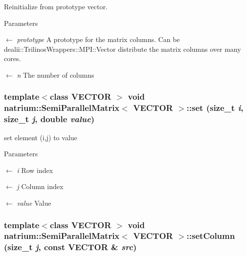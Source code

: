 Reinitialize from prototype vector. 
\begin{DoxyParams}{Parameters}
\item[\mbox{$\leftarrow$} {\em prototype}]A prototype for the matrix columns. Can be dealii::TrilinosWrappers::MPI::Vector distribute the matrix columns over many cores. \item[\mbox{$\leftarrow$} {\em n}]The number of columns \end{DoxyParams}
\hypertarget{classnatrium_1_1SemiParallelMatrix_a232fbaa6ca412b4f98d9c6aab19254de}{
\subsubsection[{set}]{\setlength{\rightskip}{0pt plus 5cm}template$<$class VECTOR $>$ void {\bf natrium::SemiParallelMatrix}$<$ VECTOR $>$::set (size\_\-t {\em i}, \/  size\_\-t {\em j}, \/  double {\em value})}}
\label{classnatrium_1_1SemiParallelMatrix_a232fbaa6ca412b4f98d9c6aab19254de}


set element (i,j) to value 
\begin{DoxyParams}{Parameters}
\item[\mbox{$\leftarrow$} {\em i}]Row index \item[\mbox{$\leftarrow$} {\em j}]Column index \item[\mbox{$\leftarrow$} {\em value}]Value \end{DoxyParams}
\hypertarget{classnatrium_1_1SemiParallelMatrix_a240c0cfc6958a66f49edc7ce205664c8}{
\subsubsection[{setColumn}]{\setlength{\rightskip}{0pt plus 5cm}template$<$class VECTOR $>$ void {\bf natrium::SemiParallelMatrix}$<$ VECTOR $>$::setColumn (size\_\-t {\em j}, \/  const VECTOR \& {\em src})}}
\label{classnatrium_1_1SemiParallelMatrix_a240c0cfc6958a66f49edc7ce205664c8}


